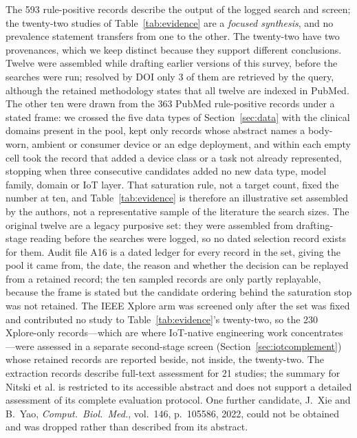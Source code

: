 \documentclass[journal]{IEEEtran}
\begin{document}
The 593 rule-positive records describe the output of the logged search and screen; the twenty-two studies of Table~\ref{tab:evidence} are a \emph{focused synthesis}, and no prevalence statement transfers from one to the other. The twenty-two have two provenances, which we keep distinct because they support different conclusions. Twelve were assembled while drafting earlier versions of this survey, before the searches were run; resolved by DOI only 3 of them are retrieved by the query, although the retained methodology states that all twelve are indexed in PubMed. The other ten were drawn from the 363 PubMed rule-positive records under a stated frame: we crossed the five data types of Section~\ref{sec:data} with the clinical domains present in the pool, kept only records whose abstract names a body-worn, ambient or consumer device or an edge deployment, and within each empty cell took the record that added a device class or a task not already represented, stopping when three consecutive candidates added no new data type, model family, domain or IoT layer. That saturation rule, not a target count, fixed the number at ten, and Table~\ref{tab:evidence} is therefore an illustrative set assembled by the authors, not a representative sample of the literature the search sizes. The original twelve are a legacy purposive set: they were assembled from drafting-stage reading before the searches were logged, so no dated selection record exists for them. Audit file A16 is a dated ledger for every record in the set, giving the pool it came from, the date, the reason and whether the decision can be replayed from a retained record; the ten sampled records are only partly replayable, because the frame is stated but the candidate ordering behind the saturation stop was not retained. The IEEE Xplore arm was screened only after the set was fixed and contributed no study to Table~\ref{tab:evidence}'s twenty-two, so the 230 Xplore-only records---which are where IoT-native engineering work concentrates---were assessed in a separate second-stage screen (Section~\ref{sec:iotcomplement}) whose retained records are reported beside, not inside, the twenty-two. The extraction records describe full-text assessment for 21 studies; the summary for Nitski et al. is restricted to its accessible abstract and does not support a detailed assessment of its complete evaluation protocol. One further candidate, J.~Xie and B.~Yao, \emph{Comput.\ Biol.\ Med.}, vol.~146, p.~105586, 2022, could not be obtained and was dropped rather than described from its abstract.
\end{document}

